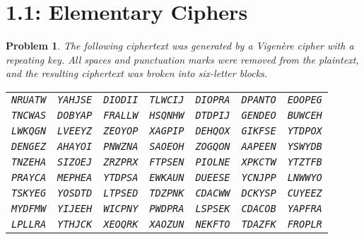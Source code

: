 \documentclass[12pt]{article}
\newtheorem{problem}{Problem}
\theoremstyle{remark}  %
\begin{document}
\setlength{\abovecaptionskip}{0pt} %
%

\rhead{\today}

\section{1.1: Elementary Ciphers}
    \begin{problem}
        The following ciphertext was generated by a Vigenère cipher with a repeating key. All spaces and punctuation marks were removed from the plaintext, and the resulting ciphertext was broken into six-letter blocks.
        \begin{center}
            \begin{tabular}{lllllll}
                \texttt{NRUATW} & \texttt{YAHJSE} & \texttt{DIODII} & \texttt{TLWCIJ} & \texttt{DIOPRA} & \texttt{DPANTO} & \texttt{EOOPEG} \\
                \texttt{TNCWAS} & \texttt{DOBYAP} & \texttt{FRALLW} & \texttt{HSQNHW} & \texttt{DTDPIJ} & \texttt{GENDEO} & \texttt{BUWCEH} \\
                \texttt{LWKQGN} & \texttt{LVEEYZ} & \texttt{ZEOYOP} & \texttt{XAGPIP} & \texttt{DEHQOX} & \texttt{GIKFSE} & \texttt{YTDPOX} \\
                \texttt{DENGEZ} & \texttt{AHAYOI} & \texttt{PNWZNA} & \texttt{SAOEOH} & \texttt{ZOGQON} & \texttt{AAPEEN} & \texttt{YSWYDB} \\
                \texttt{TNZEHA} & \texttt{SIZOEJ} & \texttt{ZRZPRX} & \texttt{FTPSEN} & \texttt{PIOLNE} & \texttt{XPKCTW} & \texttt{YTZTFB} \\
                \texttt{PRAYCA} & \texttt{MEPHEA} & \texttt{YTDPSA} & \texttt{EWKAUN} & \texttt{DUEESE} & \texttt{YCNJPP} & \texttt{LNWWYO} \\
                \texttt{TSKYEG} & \texttt{YOSDTD} & \texttt{LTPSED} & \texttt{TDZPNK} & \texttt{CDACWW} & \texttt{DCKYSP} & \texttt{CUYEEZ} \\
                \texttt{MYDFMW} & \texttt{YIJEEH} & \texttt{WICPNY} & \texttt{PWDPRA} & \texttt{LSPSEK} & \texttt{CDACOB} & \texttt{YAPFRA} \\
                \texttt{LPLLRA} & \texttt{YTHJCK} & \texttt{XEOQRK} & \texttt{XAOZUN} & \texttt{NEKFTO} & \texttt{TDAZFK} & \texttt{FROPLR} \\

\end{tabular}
\end{center}
\end{problem}
\end{document}
